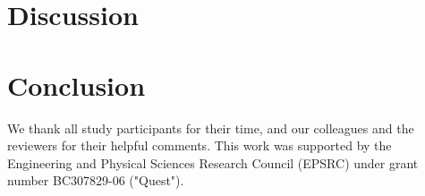 \documentclass[manuscript,screen,review]{acmart}
\begin{document}
\section{Discussion}

\section{Conclusion}

\begin{acks}
We thank all study participants for their time, and our colleagues and the reviewers for their helpful comments.
This work was supported by the Engineering and Physical Sciences Research Council (EPSRC) under grant number BC307829-06 ("Quest").
\end{acks}




\appendix
\end{document}
